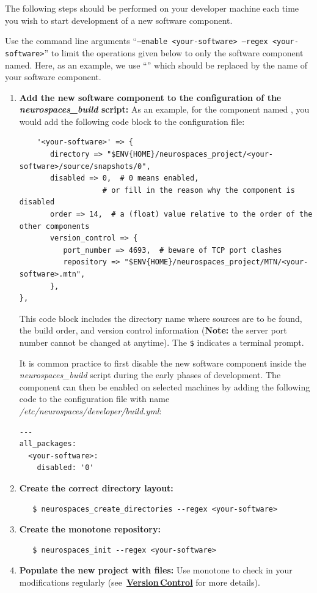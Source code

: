 \documentclass[12pt]{article}
\begin{document}
The following steps should be performed on your developer machine each time you wish to start development of a new software component.

Use the command line arguments ``{\tt --enable <your-software> --regex <your-software>}'' to limit the operations given below to only the software component named. Here, as an example, we use ``{\tt <your-software>}'' which should be replaced by the name of your software component. 

\begin{enumerate}
\item {\bf Add the new software component to the configuration of the {\it neurospaces\_build} script:} As an example, for the component named {\tt <your-software>}, you would add the following code block to the configuration file:
\begin{verbatim}
	'<your-software>' => {
	   directory => "$ENV{HOME}/neurospaces_project/<your-software>/source/snapshots/0",
	   disabled => 0,  # 0 means enabled,
                   # or fill in the reason why the component is disabled
	   order => 14,  # a (float) value relative to the order of the other components
	   version_control => {
	      port_number => 4693,  # beware of TCP port clashes
	      repository => "$ENV{HOME}/neurospaces_project/MTN/<your-software>.mtn",
	   },
},
\end{verbatim}
  This code block includes the directory name where sources are to be
  found, the build order, and version control information ({\bf Note:}
  the server port number cannot be changed at anytime). The {\tt \$} indicates a terminal prompt.

  It is common practice to first disable the new software component
  inside the {\it neurospaces\_build} script during the early phases
  of development.  The component can then be enabled on selected
  machines by adding the following code to the configuration file with
  name {\it /etc/neurospaces/developer/build.yml}:

\begin{verbatim}
---
all_packages:
  <your-software>:
    disabled: '0'
\end{verbatim}



\item {\bf Create the correct directory layout:}
\begin{verbatim}
   $ neurospaces_create_directories --regex <your-software>
\end{verbatim}
  
\item {\bf Create the monotone repository:}
\begin{verbatim}
   $ neurospaces_init --regex <your-software>
\end{verbatim}

\item {\bf Populate the new project with files:} Use monotone to check in your modifications regularly (see~\href{../version-control/version-control.tex}{\bf Version\,Control} for more details).

\end{enumerate}
\end{document}
